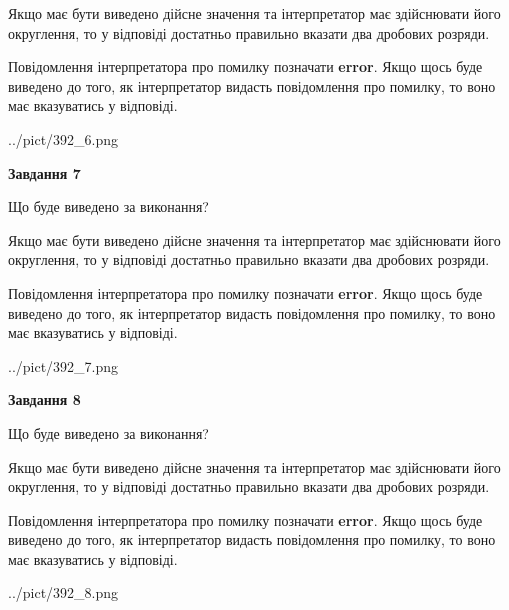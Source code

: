 \documentclass[12pt, ukrainian]{article}
\begin{document}
{\begin {Large}
Якщо має бути виведено дійсне значення та інтерпретатор має здійснювати його округлення, 
то у відповіді достатньо правильно вказати два дробових розряди.

Повідомлення інтерпретатора про помилку позначати \textbf{error}.
Якщо щось буде виведено до того, як інтерпретатор видасть повідомлення про помилку, 
то воно має вказуватись у відповіді. \par

\begin{center}
	{../pict/392_6.png}
\end{center}
\newpage

{\begin {center}\textbf{Завдання 7}\end {center}}\par
Що буде виведено за виконання? \par

Якщо має бути виведено дійсне значення та інтерпретатор має здійснювати його округлення, 
то у відповіді достатньо правильно вказати два дробових розряди.

Повідомлення інтерпретатора про помилку позначати \textbf{error}.
Якщо щось буде виведено до того, як інтерпретатор видасть повідомлення про помилку, 
то воно має вказуватись у відповіді. \par

\begin{center}
	{../pict/392_7.png}
\end{center}
\newpage

{\begin {center}\textbf{Завдання 8}\end {center}}\par
Що буде виведено за виконання? \par

Якщо має бути виведено дійсне значення та інтерпретатор має здійснювати його округлення, 
то у відповіді достатньо правильно вказати два дробових розряди.

Повідомлення інтерпретатора про помилку позначати \textbf{error}.
Якщо щось буде виведено до того, як інтерпретатор видасть повідомлення про помилку, 
то воно має вказуватись у відповіді. \par

\begin{center}
	{../pict/392_8.png}
\end{center}
\newpage


\end{Large}}
\end{document}
